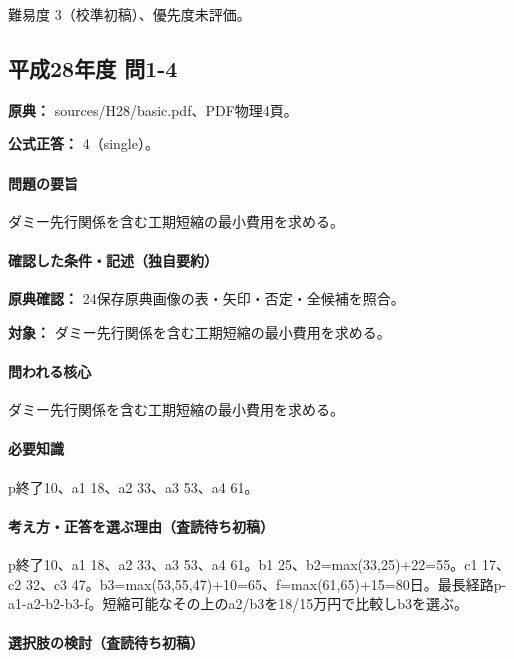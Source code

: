 \par 難易度 3（校準初稿）、優先度未評価。

\subsection{平成28年度 問1-4}
\label{q:h28-reg-basic-1-4}

\noindent\textbf{原典：} sources/H28/basic.pdf、PDF物理4頁。

\textbf{公式正答：} 4（single）。

\paragraph{問題の要旨} ダミー先行関係を含む工期短縮の最小費用を求める。

\paragraph{確認した条件・記述（独自要約）}\mbox{}\par

\noindent\textbf{原典確認：} 24保存原典画像の表・矢印・否定・全候補を照合。\par

\noindent\textbf{対象：} ダミー先行関係を含む工期短縮の最小費用を求める。\par

\paragraph{問われる核心} ダミー先行関係を含む工期短縮の最小費用を求める。

\paragraph{必要知識} p終了10、a1 18、a2 33、a3 53、a4 61。

\paragraph{考え方・正答を選ぶ理由（査読待ち初稿）} p終了10、a1 18、a2 33、a3 53、a4 61。b1 25、b2=\allowbreak{}max(33,25)+22=\allowbreak{}55。c1 17、c2 32、c3 47。b3=\allowbreak{}max(53,55,47)+10=\allowbreak{}65、f=\allowbreak{}max(61,65)+15=\allowbreak{}80日。最長経路p-a1-a2-b2-b3-f。短縮可能なその上のa2/b3を18/15万円で比較しb3を選ぶ。

\paragraph{選択肢の検討（査読待ち初稿）}\mbox{}\par

